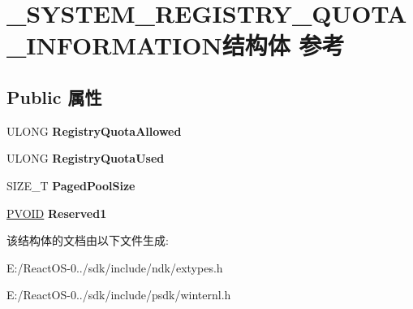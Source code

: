 \hypertarget{struct___s_y_s_t_e_m___r_e_g_i_s_t_r_y___q_u_o_t_a___i_n_f_o_r_m_a_t_i_o_n}{}\section{\+\_\+\+S\+Y\+S\+T\+E\+M\+\_\+\+R\+E\+G\+I\+S\+T\+R\+Y\+\_\+\+Q\+U\+O\+T\+A\+\_\+\+I\+N\+F\+O\+R\+M\+A\+T\+I\+O\+N结构体 参考}
\label{struct___s_y_s_t_e_m___r_e_g_i_s_t_r_y___q_u_o_t_a___i_n_f_o_r_m_a_t_i_o_n}
\subsection*{Public 属性}
\begin{DoxyCompactItemize}
\item 
\mbox{\label{struct___s_y_s_t_e_m___r_e_g_i_s_t_r_y___q_u_o_t_a___i_n_f_o_r_m_a_t_i_o_n_abe85754cd712afdf41bce98af6d5dea8}} 
U\+L\+O\+NG {\bfseries Registry\+Quota\+Allowed}
\item 
\mbox{\label{struct___s_y_s_t_e_m___r_e_g_i_s_t_r_y___q_u_o_t_a___i_n_f_o_r_m_a_t_i_o_n_ab7b236f3a8e58101abddfb47d98288c9}} 
U\+L\+O\+NG {\bfseries Registry\+Quota\+Used}
\item 
\mbox{\label{struct___s_y_s_t_e_m___r_e_g_i_s_t_r_y___q_u_o_t_a___i_n_f_o_r_m_a_t_i_o_n_a5d3178c00b23b14c679eeef8203226c2}} 
S\+I\+Z\+E\+\_\+T {\bfseries Paged\+Pool\+Size}
\item 
\mbox{\label{struct___s_y_s_t_e_m___r_e_g_i_s_t_r_y___q_u_o_t_a___i_n_f_o_r_m_a_t_i_o_n_a9f99dfc89557f025e4ad70ae5533e5bf}} 
\hyperlink{interfacevoid}{P\+V\+O\+ID} {\bfseries Reserved1}
\end{DoxyCompactItemize}


该结构体的文档由以下文件生成\+:\begin{DoxyCompactItemize}
\item 
E\+:/\+React\+O\+S-\/0../sdk/include/ndk/extypes.\+h\item 
E\+:/\+React\+O\+S-\/0../sdk/include/psdk/winternl.\+h\end{DoxyCompactItemize}
